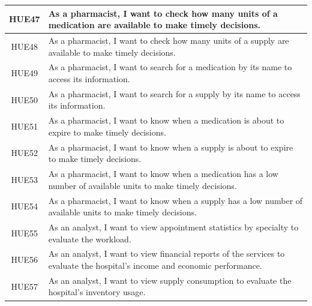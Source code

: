 \documentclass{prgrado}
\begin{document}
\begin{longtable}{|c|p{12cm}|}
HUE47 & As a pharmacist, I want to check how many units of a medication are available to make timely decisions. \\ \hline
HUE48 & As a pharmacist, I want to check how many units of a supply are available to make timely decisions. \\ \hline
HUE49 & As a pharmacist, I want to search for a medication by its name to access its information. \\ \hline
HUE50 & As a pharmacist, I want to search for a supply by its name to access its information. \\ \hline
HUE51 & As a pharmacist, I want to know when a medication is about to expire to make timely decisions. \\ \hline
HUE52 & As a pharmacist, I want to know when a supply is about to expire to make timely decisions. \\ \hline
HUE53 & As a pharmacist, I want to know when a medication has a low number of available units to make timely decisions. \\ \hline
HUE54 & As a pharmacist, I want to know when a supply has a low number of available units to make timely decisions. \\ \hline
HUE55 & As an analyst, I want to view appointment statistics by specialty to evaluate the workload. \\ \hline
HUE56 & As an analyst, I want to view financial reports of the services to evaluate the hospital's income and economic performance. \\ \hline
HUE57 & As an analyst, I want to view supply consumption to evaluate the hospital's inventory usage. \\ \hline
\end{longtable}
\end{document}
